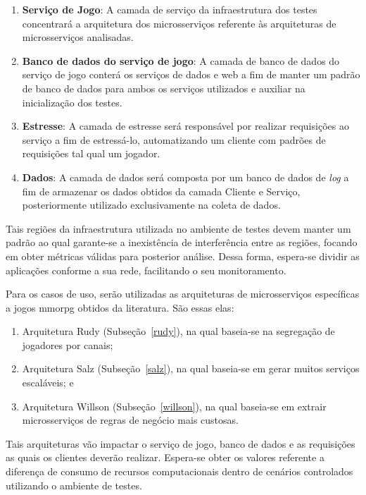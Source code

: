 \begin{enumerate}
  \item \textbf{Serviço de Jogo}: A camada de serviço da infraestrutura dos testes concentrará a arquitetura dos microsserviços referente às arquiteturas de microsserviços analisadas.
  \item \textbf{Banco de dados do serviço de jogo}: A camada de banco de dados do serviço de jogo conterá os serviços de dados e web a fim de manter um padrão de banco de dados para ambos os serviços utilizados e auxiliar na inicialização dos testes.
  \item \textbf{Estresse}: A camada de estresse será responsável por realizar requisições ao serviço a fim de estressá-lo, automatizando um cliente com padrões de requisições tal qual um jogador.
  \item \textbf{Dados}: A camada de dados será composta por um banco de dados de \textit{log} a fim de armazenar os dados obtidos da camada Cliente e Serviço, posteriormente utilizado exclusivamente na coleta de dados.
\end{enumerate}



Tais regiões da infraestrutura utilizada no ambiente de testes devem manter um padrão ao qual garante-se a inexistência de interferência entre as regiões, focando em obter métricas válidas para posterior análise.
%
Dessa forma, espera-se dividir as aplicações conforme a sua rede, facilitando o seu monitoramento.


Para os casos de uso, serão utilizadas as arquiteturas de microsserviços específicas a jogos \ac{mmorpg} obtidos da literatura.
%
São essas elas:



\begin{enumerate}
  \item Arquitetura Rudy (Subseção~\ref{rudy}), na qual baseia-se na segregação de jogadores por canais;
  \item Arquitetura Salz (Subseção~\ref{salz}), na qual baseia-se em gerar muitos serviços escaláveis; e
  \item Arquitetura Willson (Subseção~\ref{willson}), na qual baseia-se em extrair microsserviços de regras de negócio mais custosas.
\end{enumerate}



Tais arquiteturas vão impactar o serviço de jogo, banco de dados e as requisições as quais os clientes deverão realizar.
%
Espera-se obter os valores referente a diferença de consumo de recursos computacionais dentro de cenários controlados utilizando o ambiente de testes.



